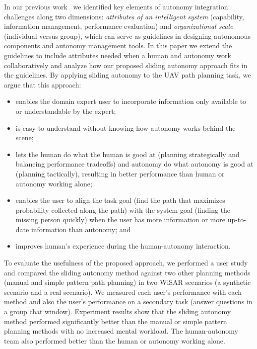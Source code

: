 In our previous work~\cite{Lin2010Supporting} we identified key elements of autonomy integration challenges along two dimensions: \textit{attributes of an intelligent system} (capability, information management, performance evaluation) and \textit{organizational scale} (individual versus group), which can serve as guidelines in designing autonomous components and autonomy management tools. In this paper we extend the guidelines to include attributes needed when a human and autonomy work collaboratively and analyze how our proposed sliding autonomy approach fits in the guidelines. By applying sliding autonomy to the UAV path planning task, we argue that this approach:
\begin{itemize}
\item enables the domain expert user to incorporate information only available to or understandable by the expert;
\item is easy to understand without knowing how autonomy works behind the scene;
\item lets the human do what the human is good at (planning strategically and balancing performance tradeoffs) and autonomy do what autonomy is good at (planning tactically), resulting in better performance than human or autonomy working alone;
\item enables the user to align the task goal (find the path that maximizes probability collected along the path) with the system goal (finding the missing person quickly) when the user has more information or more up-to-date information than autonomy; and
\item improves human's experience during the human-autonomy interaction.
\end{itemize}

To evaluate the usefulness of the proposed approach, we performed a user study and compared the sliding autonomy method against two other planning methods (manual and simple pattern path planning) in two WiSAR scenarios (a synthetic scenario and a real scenario). We measured each user's performance with each method and also the user's performance on a secondary task (answer questions in a group chat window). Experiment results show that the sliding autonomy method performed significantly better than the manual or simple pattern planning methods with no increased mental workload. The human-autonomy team also performed better than the human or autonomy working alone.

